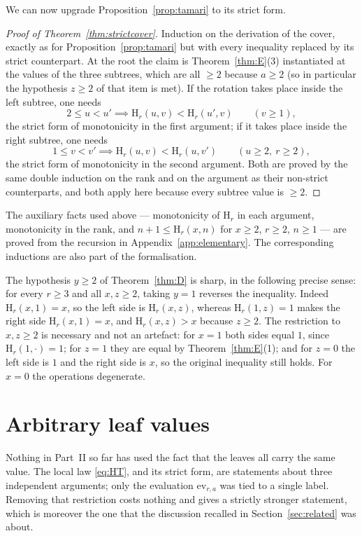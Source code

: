 \documentclass[11pt,a4paper]{article}
\theoremstyle{plain}
\theoremstyle{definition}
\newcommand{\HH}{\mathrm{H}}
\newcommand{\ev}{\mathrm{ev}}
\begin{document}
We can now upgrade Proposition~\ref{prop:tamari} to its strict form.

\begin{proof}[Proof of Theorem~\ref{thm:strictcover}]
Induction on the derivation of the cover, exactly as for
Proposition~\ref{prop:tamari} but with every inequality replaced by its strict
counterpart. At the root the claim is Theorem~\ref{thm:E}(3) instantiated at the
values of the three subtrees, which are all $\ge2$ because $a\ge2$
(so in particular the hypothesis $z\ge2$ of that item is met). If the rotation takes
place inside the left subtree, one needs
\[
  2\le u<u' \implies \HH_r(u,v)<\HH_r(u',v) \qquad (v\ge1),
\]
the strict form of monotonicity in the first argument; if it takes place inside the
right subtree, one needs
\[
  1\le v<v' \implies \HH_r(u,v)<\HH_r(u,v') \qquad (u\ge2,\ r\ge2),
\]
the strict form of monotonicity in the second argument. Both are proved by the same
double induction on the rank and on the argument as their non-strict counterparts,
and both apply here because every subtree value is $\ge2$.
\end{proof}

The auxiliary facts used above --- monotonicity of $\HH_r$ in each argument,
monotonicity in the rank, and $n+1\le\HH_r(x,n)$ for $x\ge2$, $r\ge2$,
$n\ge1$ --- are proved from the recursion in Appendix~\ref{app:elementary}. The
corresponding inductions are also part of the formalisation.

The hypothesis $y\ge2$ of Theorem~\ref{thm:D} is sharp, in the following precise
sense: for every $r\ge3$ and all $x,z\ge2$, taking $y=1$ reverses the inequality.
Indeed $\HH_r(x,1)=x$, so the left side is $\HH_r(x,z)$, whereas $\HH_r(1,z)=1$ makes
the right side $\HH_r(x,1)=x$, and $\HH_r(x,z)>x$ because $z\ge2$. The restriction to
$x,z\ge2$ is necessary and not an artefact: for $x=1$ both sides equal $1$, since
$\HH_r(1,\cdot)=1$; for $z=1$ they are equal by Theorem~\ref{thm:E}(1); and for $z=0$
the left side is $1$ and the right side is $x$, so the original inequality still holds.
For $x=0$ the operations degenerate.
\section{Arbitrary leaf values}\label{sec:varleaf}

Nothing in Part~II so far has used the fact that the leaves all carry the same value. The local
law \eqref{eq:HT}, and its strict form, are statements about three independent
arguments; only the evaluation $\ev_{r,a}$ was tied to a single label. Removing that
restriction costs nothing and gives a strictly stronger statement, which is moreover
the one that the discussion recalled in Section~\ref{sec:related} was about.
\end{document}
